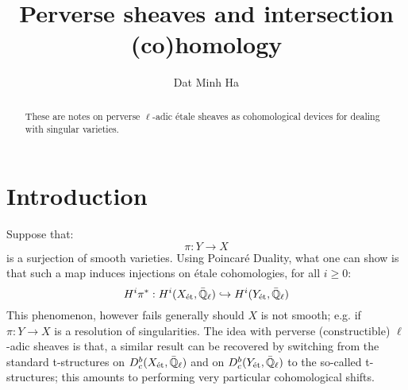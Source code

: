 

\setcounter{section}{-1}





    \title{Perverse sheaves and intersection (co)homology}
    
    \author{Dat Minh Ha}
    \maketitle
    
    \begin{abstract}
        These are notes on perverse $\ell$-adic \'etale sheaves as cohomological devices for dealing with singular varieties. 
    \end{abstract}
    
    {
      \hypersetup{} 
      \tableofcontents %
    }

    \section{Introduction}
        Suppose that:
            $$\pi: Y \to X$$
        is a surjection of smooth varieties. Using Poincar\'e Duality, what one can show is that such a map induces injections on \'etale cohomologies, for all $i \geq 0$:
            $$H^i\pi^*: H^i(X_{\mathrm{\acute{e}t}}, \bar{\mathbb{Q}}_{\ell}) \hookrightarrow H^i(Y_{\mathrm{\acute{e}t}}, \bar{\mathbb{Q}}_{\ell})$$
        This phenomenon, however fails generally should $X$ is not smooth; e.g. if $\pi: Y \to X$ is a resolution of singularities. The idea with perverse (constructible) $\ell$-adic sheaves is that, a similar result can be recovered by switching from the standard t-structures on $D^b_c(X_{\mathrm{\acute{e}t}}, \bar{\mathbb{Q}}_{\ell})$ and on $D^b_c(Y_{\mathrm{\acute{e}t}}, \bar{\mathbb{Q}}_{\ell})$ to the so-called  t-structures; this amounts to performing very particular cohomological shifts. 
    
    \printbibliography

